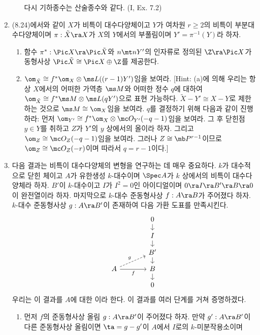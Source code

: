 \begin{enumerate}[label=\tb{8.\arabic*.},itemindent=0mm,itemsep=2mm]
\begin{enumerate}[label=(\alph*)]
	다시 기하종수는 산술종수와 같다. (I, Ex. 7.2)
	\end{enumerate}
	\item {} (8.24)에서와 같이 $X$가 비특이 대수다양체이고 $Y$가 여차원 $r\ge 2$의 비특이 부분대수다양체이며
	$\pi:\tilde X\ra X$가 $X$의 $Y$에서의 부풀림이며 $Y'=\pi^{-1}(Y)$라 하자.
	\begin{enumerate}[label=(\alph*)]
	\item 함수 $\pi^*:\Pic X\ra\Pic\tilde X$와 $n\mt nY'$의 인자류로 정의된 $\Z\ra\Pic X$가
	동형사상 $\Pic\tilde X\cong\Pic X\oplus\Z$를 제공한다.
	\item $\om_{\tilde X}\cong f^*\om_X\otimes\ms L((r-1)Y')$임을 보여라.
	[Hint: (a)에 의해 우리는 항상 $X$에서의 어떠한 가역층 $\ms M$와 어떠한 정수 $q$에 대하여
	$\om_{\tilde X}\cong f^*\ms M\otimes\ms L(qY')$으로 표현 가능하다.
	$\tilde X-Y'\cong X-Y$로 제한하는 것으로 $\ms M\cong\om_X$임을 보여라. $q$를 결정하기 위해 다음과 같이 진행하라:
	먼저 $\om_{Y'}\cong f^*\om_X\otimes\mc O_{Y'}(-q-1)$임을 보여라.
	그 후 닫힌점 $y\in Y$를 취하고 $Z$가 $Y'$의 $y$ 상에서의 올이라 하자.
	그리고 $\om_Z\cong\mc O_Z(-q-1)$임을 보여라. 그러나 $Z\cong\mb P^{r-1}$이므로 $\om_Z\cong\mc O_Z(-r)$이며 따라서 $q=r-1$이다.]
	\end{enumerate}
	\item {} 다음 결과는 비특이 대수다양체의 변형을 연구하는 데 매우 중요하다.
	$k$가 대수적으로 닫힌 체이고 $A$가 유한생성 $k$-대수이며 $\Spec A$가 $k$ 상에서의 비특이 대수다양체라 하자.
	$B'$이 $k$-대수이고 $I$가 $I^2=0$인 아이디얼이며 $0\ra I\ra B'\ra B\ra 0$이 완전열이라 하자.
	마지막으로 $k$-대수 준동형사상 $f:A\ra B$가 주어졌다 하자. $k$-대수 준동형사상 $g:A\ra B'$이 존재하여 다음 가환 도표를 만족시킨다.
	$$\begin{tikzcd}[row sep=small,column sep=large ]&0\arrow[d]\\&I\arrow[d]\\&B'\arrow[d]\\
	A\arrow[dashed,ur,"g"]\arrow[r,swap,"f"]&B\arrow[d]\\&0\end{tikzcd}$$
	우리는 이 결과를 $A$에 대한 이라 한다. 이 결과를 여러 단계를 거쳐 증명하겠다.
	\begin{enumerate}[label=(\alph*)]
	\item 먼저 $f$의 준동형사상 올림 $g:A\ra B'$이 주어졌다 하자.
	만약 $g':A\ra B'$이 다른 준동형사상 올림이면 $\ta=g-g'$이 $A$에서 $I$로의 $k$-미분작용소이며

\end{enumerate}
\end{enumerate}
